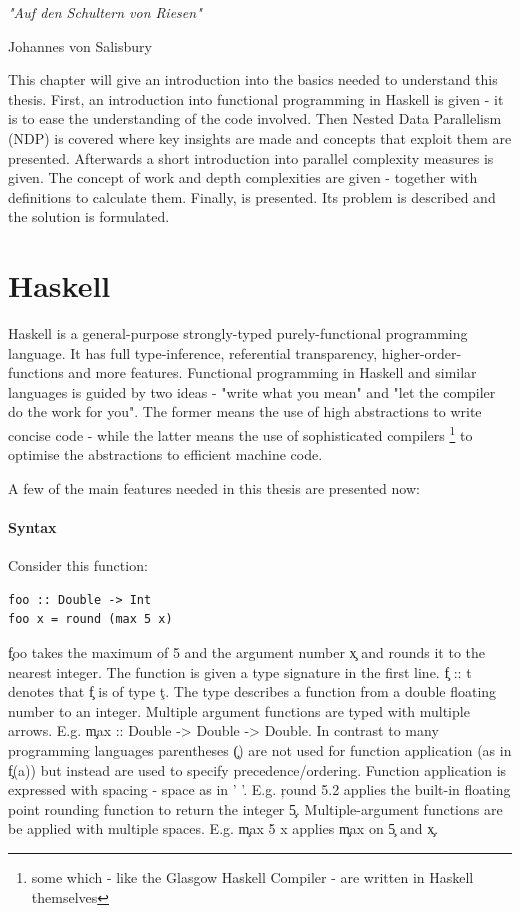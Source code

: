 
\epigraph{\emph{
"Auf den Schultern von Riesen"
}}{
Johannes von Salisbury
}

This chapter will give an introduction into the basics needed to
understand this thesis. First, an introduction into functional programming
in Haskell is given - it is to ease the understanding of the code involved.
Then Nested Data Parallelism (NDP) is covered where
key insights are made and concepts that exploit them are presented.
Afterwards a short introduction into parallel complexity measures is given.
The concept of work and depth complexities are given
- together with definitions to calculate them.
Finally, \algo is presented. Its problem is described and
the solution is formulated.

\section{Haskell}
  Haskell is a general-purpose strongly-typed purely-functional programming
  language. It has full type-inference, referential transparency, higher-order-functions
  and more features. Functional programming in Haskell and similar languages
  is guided by two ideas - "write what you mean" and "let the compiler do the work for you".
  The former means the use of high abstractions to write concise code -
  while the latter means the use of sophisticated compilers
  \footnote{some which - like the Glasgow Haskell Compiler - are written in Haskell themselves}
  to optimise the abstractions to efficient machine code.
  
  A few of the main features needed in this thesis are presented now:
  
  
  \paragraph{Syntax}
    Consider this function:
    \begin{lstlisting}
foo :: Double -> Int
foo x = round (max 5 x)
    \end{lstlisting}
    \c{foo} takes the maximum of 5 and the argument number \c{x} and
    rounds it to the nearest integer. The function is given a type
    signature in the first line. \c{f :: t} denotes that \c{f} is of type \c{t}.
    The type describes a function from a double floating number
    to an integer. Multiple argument functions are typed with multiple arrows.
    E.g. \c{max :: Double -> Double -> Double}.
    In contrast to many programming languages parentheses \c{()} are not used for function application
    (as in \c{f(a)}) but instead are used to specify precedence/ordering.
    Function application is expressed with spacing - space as in ' '. E.g. \c{round 5.2} applies the built-in
    floating point rounding function to return the integer \c{5}. Multiple-argument
    functions are be applied with multiple spaces. E.g. \c{max 5 x}
    applies \c{max} on \c{5} and \c{x}.
    
